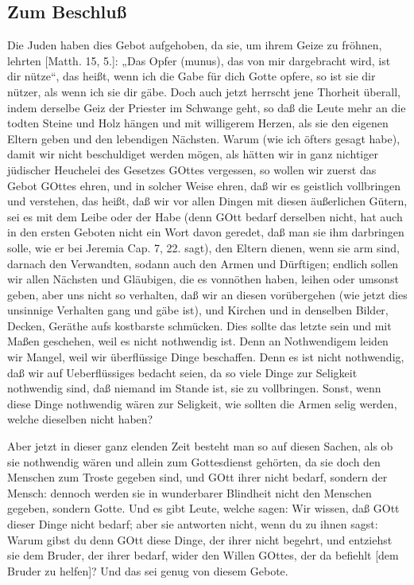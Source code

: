 \subsection{Zum Beschluß}

Die Juden haben dies Gebot aufgehoben, da sie, um ihrem Geize zu fröhnen, lehrten [Matth. 15, 5.]: „Das Opfer (munus), das von mir dargebracht wird, ist dir nütze“, das heißt, wenn ich die Gabe für dich Gotte opfere, so ist sie dir nützer, als wenn ich sie dir gäbe. Doch auch jetzt herrscht jene Thorheit überall, indem derselbe Geiz der Priester im Schwange geht, so daß die Leute mehr an die todten Steine und Holz hängen und mit willigerem Herzen, als sie den eigenen Eltern geben und den lebendigen Nächsten. Warum (wie ich öfters gesagt habe), damit wir nicht beschuldiget werden mögen, als hätten wir in ganz nichtiger jüdischer Heuchelei des Gesetzes GOttes vergessen, so wollen wir zuerst das Gebot GOttes ehren, und in solcher Weise ehren, daß wir es geistlich vollbringen und verstehen, das heißt, daß wir vor allen Dingen mit diesen äußerlichen Gütern, sei es mit dem Leibe oder der Habe (denn GOtt bedarf derselben nicht, hat auch in den ersten Geboten nicht ein Wort davon geredet, daß man sie ihm darbringen solle, wie er bei Jeremia Cap. 7, 22. sagt), den Eltern dienen, wenn sie arm sind, darnach den Verwandten, sodann auch den Armen und Dürftigen; endlich sollen wir allen Nächsten und Gläubigen, die es vonnöthen haben, leihen oder umsonst geben, aber uns nicht so verhalten, daß wir an diesen vorübergehen (wie jetzt dies unsinnige Verhalten gang und gäbe ist), und Kirchen und in denselben Bilder, Decken, Geräthe aufs kostbarste schmücken. Dies sollte das letzte sein und mit Maßen geschehen, weil es nicht nothwendig ist. Denn an Nothwendigem leiden wir Mangel, weil wir überflüssige Dinge beschaffen. Denn es ist nicht nothwendig, daß wir auf Ueberflüssiges bedacht seien, da so viele Dinge zur Seligkeit nothwendig sind, daß niemand im Stande ist, sie zu vollbringen. Sonst, wenn diese Dinge nothwendig wären zur Seligkeit, wie sollten die Armen selig werden, welche dieselben nicht haben?

Aber jetzt in dieser ganz elenden Zeit besteht man so auf diesen Sachen, als ob sie nothwendig wären und allein zum Gottesdienst gehörten, da sie doch den Menschen zum Troste gegeben sind, und GOtt ihrer nicht bedarf, sondern der Mensch: dennoch werden sie in wunderbarer Blindheit nicht den Menschen gegeben, sondern Gotte. Und es gibt Leute, welche sagen: Wir wissen, daß GOtt dieser Dinge nicht bedarf; aber sie antworten nicht, wenn du zu ihnen sagst: Warum gibst du denn GOtt diese Dinge, der ihrer nicht begehrt, und entziehst sie dem Bruder, der ihrer bedarf, wider den Willen GOttes, der da befiehlt [dem Bruder zu helfen]? Und das sei genug von diesem Gebote.

